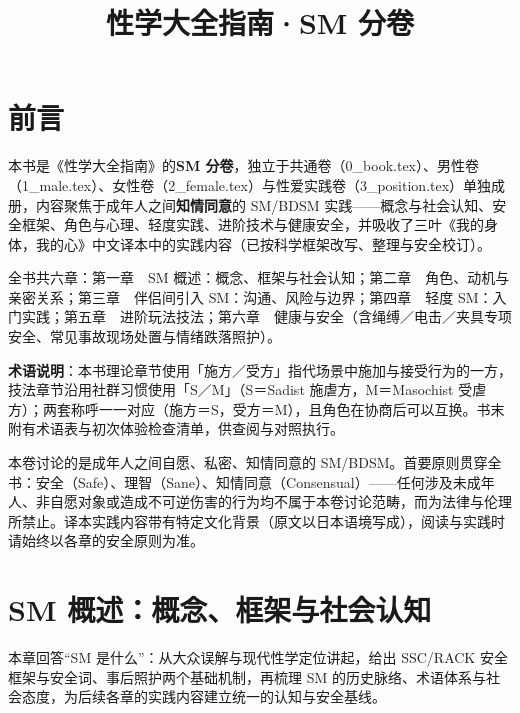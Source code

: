 \documentclass[12pt,UTF8]{ctexbook}
\title{\heiti\zihao{0} 性学大全指南·SM 分卷}
\author{}
\date{}
\newcommand{\keyword}[1]{\textbf{#1}}
\begin{document}
\maketitle

\frontmatter

\chapter{前言}

本书是《性学大全指南》的\keyword{SM 分卷}，独立于共通卷（0\_book.tex）、男性卷（1\_male.tex）、女性卷（2\_female.tex）与性爱实践卷（3\_position.tex）单独成册，内容聚焦于成年人之间\keyword{知情同意}的 SM/BDSM 实践——概念与社会认知、安全框架、角色与心理、轻度实践、进阶技术与健康安全，并吸收了三叶《我的身体，我的心》中文译本中的实践内容（已按科学框架改写、整理与安全校订）。

全书共六章：第一章　SM 概述：概念、框架与社会认知；第二章　角色、动机与亲密关系；第三章　伴侣间引入 SM：沟通、风险与边界；第四章　轻度 SM：入门实践；第五章　进阶玩法技法；第六章　健康与安全（含绳缚／电击／夹具专项安全、常见事故现场处置与情绪跌落照护）。

\textbf{术语说明}：本书理论章节使用「施方／受方」指代场景中施加与接受行为的一方，技法章节沿用社群习惯使用「S／M」（S＝Sadist 施虐方，M＝Masochist 受虐方）；两套称呼一一对应（施方＝S，受方＝M），且角色在协商后可以互换。书末附有术语表与初次体验检查清单，供查阅与对照执行。

\begin{tcolorbox}[colback=pink!5!white,colframe=red!50!black,title=使用说明]
本卷讨论的是成年人之间自愿、私密、知情同意的 SM/BDSM。首要原则贯穿全书：安全（Safe）、理智（Sane）、知情同意（Consensual）——任何涉及未成年人、非自愿对象或造成不可逆伤害的行为均不属于本卷讨论范畴，而为法律与伦理所禁止。译本实践内容带有特定文化背景（原文以日本语境写成），阅读与实践时请始终以各章的安全原则为准。
\end{tcolorbox}

\tableofcontents

\mainmatter

\chapter{SM 概述：概念、框架与社会认知}

本章回答“SM 是什么”：从大众误解与现代性学定位讲起，给出 SSC/RACK 安全框架与安全词、事后照护两个基础机制，再梳理 SM 的历史脉络、术语体系与社会态度，为后续各章的实践内容建立统一的认知与安全基线。
\end{document}

